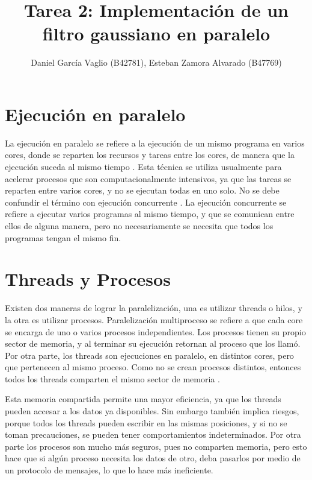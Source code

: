 \documentclass {article}
\begin{document}
\title{Tarea 2: Implementación de un filtro gaussiano en paralelo}
\author{Daniel García Vaglio (B42781), Esteban Zamora Alvarado (B47769)}

\maketitle

\section{Ejecución en paralelo}

La ejecución en paralelo se refiere a la ejecución de un mismo programa en varios cores, donde
se reparten los recursos y tareas entre los cores, de manera que la ejecución suceda al mismo
tiempo \cite{blaise2017}.
Esta técnica se utiliza  usualmente para acelerar procesos que son computacionalmente intensivos, ya
que las tareas se reparten entre varios cores, y no se ejecutan todas en uno solo. No se debe
confundir el término con ejecución concurrente \cite{grossman2012}.
La ejecución concurrente se refiere a ejecutar varios programas al mismo tiempo, y que se comunican
entre ellos de alguna manera, pero no necesariamente se necesita que todos los programas tengan el
mismo fin.

\section{Threads y Procesos}

Existen dos maneras de lograr la paralelización, una es utilizar threads o hilos, y la otra es
utilizar procesos. Paralelización multiproceso se refiere a que cada core se encarga de uno o
varios procesos independientes. Los procesos tienen su propio sector de memoria, y al terminar su
ejecución retornan al proceso que los llamó. Por otra parte, los threads son ejecuciones en
paralelo, en distintos cores, pero que pertenecen al mismo proceso. Como no se crean procesos
distintos, entonces todos los threads comparten el mismo sector de memoria \cite{oracle2015}.

Esta memoria compartida permite una mayor eficiencia, ya que los threads pueden accesar a los datos
ya disponibles. Sin embargo también implica riesgos, porque todos los threads pueden escribir en las
mismas posiciones, y si no se toman precauciones, se pueden tener comportamientos
indeterminados. Por otra parte los procesos son mucho más seguros, pues no comparten memoria, pero
esto hace que si algún proceso necesita los datos de otro, deba pasarlos por medio de un protocolo
de mensajes, lo que lo hace más ineficiente.
\end{document}
